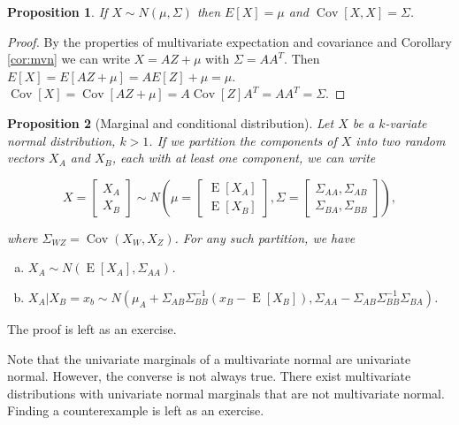 \documentclass{book}
\theoremstyle{plain}%
\newtheorem{proposition}{Proposition}[section]
\theoremstyle{definition}
\DeclareMathOperator{\Cov}{Cov}
\DeclareMathOperator{\E}{E}
\begin{document}
\begin{proposition}
If $X \sim N(\mu, \Sigma)$ then $E[X] = \mu$ and $\Cov[X,X] = \Sigma$.\label{prop:mvnmean}
\end{proposition}

\begin{proof}
By the properties of multivariate expectation and covariance and Corollary \ref{cor:mvn} we can write $X = AZ + \mu$ with $\Sigma = AA^T$. Then $E[X] = E[AZ + \mu] = AE[Z] + \mu = \mu$. $\Cov[X] = \Cov[AZ + \mu] = A\Cov[Z]A^T = AA^T = \Sigma$.
\end{proof}

\begin{proposition}[Marginal and conditional distribution]
Let $X$ be a $k$-variate normal distribution, $k > 1$. If we partition the components of $X$ into two random vectors $X_A$ and $X_B$, each with at least one component, we can write

$$X = \begin{bmatrix}
           X_{A} \\
           X_{B}
         \end{bmatrix}\sim N\left( \mu =  \begin{bmatrix}
           \E[X_A] \\
           \E[X_B]
         \end{bmatrix}, \Sigma = \begin{bmatrix}
           \Sigma_{AA}, \Sigma_{AB} \\
           \Sigma_{BA}, \Sigma_{BB}
         \end{bmatrix}  \right),$$
         
where $\Sigma_{WZ} = \Cov(X_W, X_Z)$. For any such partition, we have

\begin{enumerate}[(a)]
\item $X_A \sim N(\E[X_A], \Sigma_{AA})$.
\item $X_A | X_B = x_b \sim N(\mu_A + \Sigma_{AB}\Sigma_{BB}^{-1}(x_B - \E[X_B]), \Sigma_{AA} - \Sigma_{AB}\Sigma_{BB}^{-1}\Sigma_{BA})$.

\end{enumerate}\label{prop:marginal}

\end{proposition}

The proof is left as an exercise.

Note that the univariate marginals of a multivariate normal are univariate normal. However, the converse is not always true. There exist multivariate distributions with univariate normal marginals that are not multivariate normal. Finding a counterexample is left as an exercise.
\end{document}
